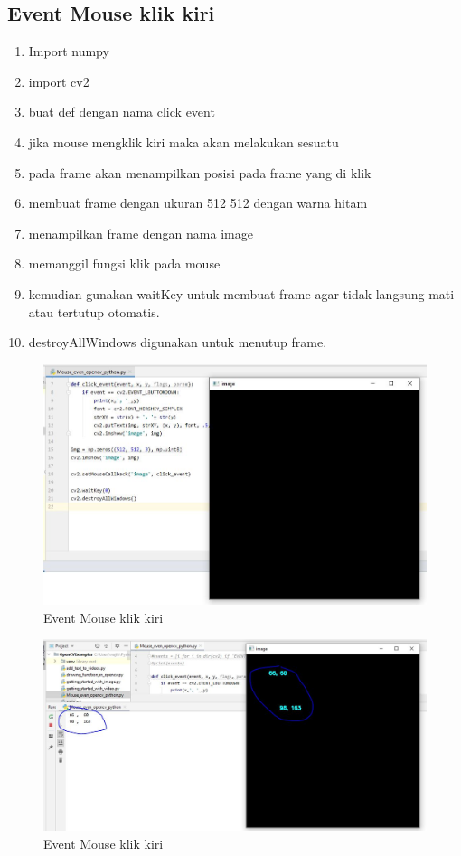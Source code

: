 \newpage
\subsection{Event Mouse klik kiri}

\begin{enumerate}
	\item Import numpy
	\item import cv2
	\item buat def dengan nama click event
	\item jika mouse mengklik kiri maka akan melakukan sesuatu
	\item pada frame akan menampilkan posisi pada frame yang di klik
	\item membuat frame dengan ukuran 512 512 dengan warna hitam
	\item menampilkan frame dengan nama image
	\item memanggil fungsi klik pada mouse
	\item kemudian gunakan waitKey untuk membuat frame agar tidak langsung mati atau tertutup otomatis.
	\item destroyAllWindows digunakan untuk menutup frame.
\end{enumerate}

\newpage
\begin{figure}[ht]
\centering
\includegraphics[scale=0.4]{figures/2,20.jpg}
\caption{Event Mouse klik kiri}
\label{contoh}
\end{figure}

\begin{figure}[ht]
\centering
\includegraphics[scale=0.4]{figures/2,20,1.jpg}
\caption{Event Mouse klik kiri}
\label{contoh}
\end{figure}

